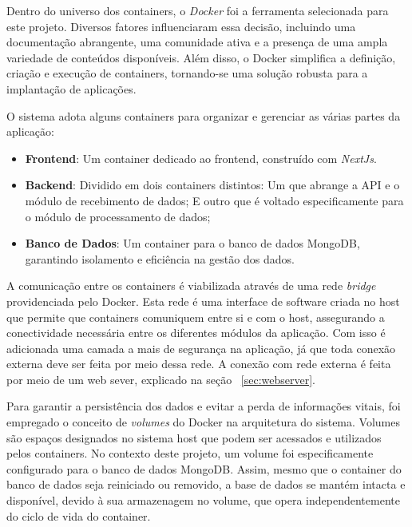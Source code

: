 Dentro do universo dos containers, o \textit{Docker} foi a ferramenta selecionada para este projeto. Diversos fatores influenciaram essa decisão, incluindo uma documentação abrangente, uma comunidade ativa e a presença de uma ampla variedade de conteúdos disponíveis. Além disso, o Docker simplifica a definição, criação e execução de containers, tornando-se uma solução robusta para a implantação de aplicações.

O sistema adota alguns containers para organizar e gerenciar as várias partes da aplicação:
\begin{itemize}
    \item \textbf{Frontend}: Um container dedicado ao frontend, construído com \textit{NextJs}.
    \item \textbf{Backend}: Dividido em dois containers distintos:
	\subitem Um que abrange a API e o módulo de recebimento de dados;
	\subitem E outro que é voltado especificamente para o módulo de processamento de dados;
    \item \textbf{Banco de Dados}: Um container para o banco de dados MongoDB, garantindo isolamento e eficiência na gestão dos dados.
\end{itemize}

A comunicação entre os containers é viabilizada através de uma rede \textit{bridge} providenciada pelo Docker. Esta rede é uma interface de software criada no host que permite que containers comuniquem entre si e com o host, assegurando a conectividade necessária entre os diferentes módulos da aplicação. Com isso é adicionada uma camada a mais de segurança na aplicação, já que toda conexão externa deve ser feita por meio dessa rede. A conexão com rede externa é feita por meio de um web sever, explicado na seção ~\ref{sec:webserver}.

Para garantir a persistência dos dados e evitar a perda de informações vitais, foi empregado o conceito de \textit{volumes} do Docker na arquitetura do sistema. Volumes são espaços designados no sistema host que podem ser acessados e utilizados pelos containers. No contexto deste projeto, um volume foi especificamente configurado para o banco de dados MongoDB. Assim, mesmo que o container do banco de dados seja reiniciado ou removido, a base de dados se mantém intacta e disponível, devido à sua armazenagem no volume, que opera independentemente do ciclo de vida do container.

